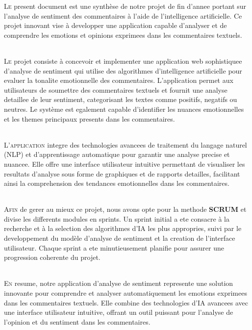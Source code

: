 
\lettrine[nindent=0em, slope=.5em] {\color{Eblue}L}{e} present document est une synthèse de notre projet de fin d'annee portant sur l'analyse de sentiment des commentaires à l'aide de l'intelligence artificielle. Ce projet innovant vise à developper une application capable d'analyser et de comprendre les emotions et opinions exprimees dans les commentaires textuels.

\ \\

\lettrine[nindent=0em, slope=.5em] {\color{Eblue}L}{e} projet consiste à concevoir et implementer une application web sophistiquee d'analyse de sentiment qui utilise des algorithmes d'intelligence artificielle pour evaluer la tonalite emotionnelle des commentaires. L'application permet aux utilisateurs de soumettre des commentaires textuels et fournit une analyse detaillee de leur sentiment, categorisant les textes comme positifs, negatifs ou neutres. Le système est egalement capable d'identifier les nuances emotionnelles et les themes principaux presents dans les commentaires.

\ \\

\lettrine[nindent=0em, slope=.5em] {\color{Eblue}L}{'application} integre des technologies avancees de traitement du langage naturel (NLP) et d'apprentissage automatique pour garantir une analyse precise et nuancee. Elle offre une interface utilisateur intuitive permettant de visualiser les resultats d'analyse sous forme de graphiques et de rapports detailles, facilitant ainsi la comprehension des tendances emotionnelles dans les commentaires.

\ \\

\lettrine[nindent=0em, slope=.5em] {\color{Eblue}A}{fin} de gerer au mieux ce projet, nous avons opte pour la methode \textbf{SCRUM} et divise les differents modules en sprints. Un sprint initial a ete consacre à la recherche et à la selection des algorithmes d'IA les plus appropries, suivi par le developpement du modèle d'analyse de sentiment et la creation de l'interface utilisateur. Chaque sprint a ete minutieusement planifie pour assurer une progression coherente du projet.

\ \\

\lettrine[nindent=0em, slope=.5em] {\color{Eblue}E}{n} resume, notre application d'analyse de sentiment represente une solution innovante pour comprendre et analyser automatiquement les emotions exprimees dans les commentaires textuels. Elle combine des technologies d'IA avancees avec une interface utilisateur intuitive, offrant un outil puissant pour l'analyse de l'opinion et du sentiment dans les commentaires.
